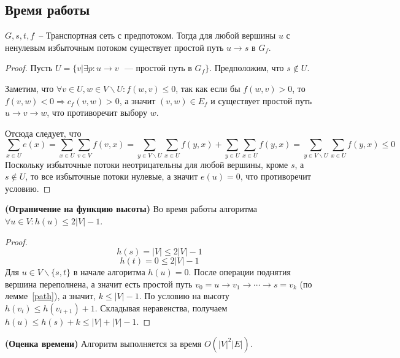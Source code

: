 \subsection{Время работы}
\begin{lemma}\label{path}
	$G,s,t,f$~-- Транспортная сеть с предпотоком. Тогда для любой вершины $u$ с ненулевым избыточным потоком существует простой путь $u\to s$ в $G_f$.
\end{lemma}
\begin{proof}
	Пусть $U=\{v|\exists p\colon u\to v\text{ ~--- простой путь в }G_f\}$. Предположим, что $s\not\in U$.

	Заметим, что $\forall v\in U, w\in V\smallsetminus U\colon f(w,v)\le 0$, так как если бы $f(w,v)>0$, то $f(v,w)<0\Rightarrow c_f(v,w)>0$, а значит $(v,w)\in E_f$ и существует простой путь $u\to v\to w$, что противоречит выбору $w$.

	Отсюда следует, что
	$$
	\sum_{x\in U}e(x)=\sum_{x\in U}\sum_{v\in V}f(v,x)=\sum_{y\in V\smallsetminus U}\sum_{x\in U}f(y,x)+\sum_{y\in U}\sum_{x\in U}f(y,x)=\sum_{y\in V\smallsetminus U}\sum_{x\in U}f(y,x)\le 0
	$$
	Поскольку избыточные потоки неотрицательны для любой вершины, кроме $s$, а $s\not\in U$, то все избыточные потоки нулевые, а значит $e(u)=0$, что противоречит условию.
\end{proof}
\begin{lemma}{\bf (Ограничение на функцию высоты)}
	Во время работы алгоритма $\forall u\in V\colon h(u)\le 2|V|-1$.
\end{lemma}
\begin{proof}
	$$h(s)=|V|\le 2|V|-1$$
	$$h(t)=0\le 2|V|-1$$
	Для $u\in V\smallsetminus\{s,t\}$ в начале алгоритма $h(u)=0$. После операции поднятия вершина переполнена, а значит есть простой путь $v_0=u\to v_1\to\cdots\to s=v_k$ (по лемме~\ref{path}), а значит, $k\le |V|-1$. По условию на высоту $h(v_i)\le h(v_{i+1})+1$. Складывая неравенства, получаем $h(u)\le h(s)+k\le |V|+|V|-1$.
\end{proof}
\begin{theorem}{\bf (Оценка времени)}
	Алгоритм выполняется за время $O(|V|^2|E|)$.
\end{theorem}
